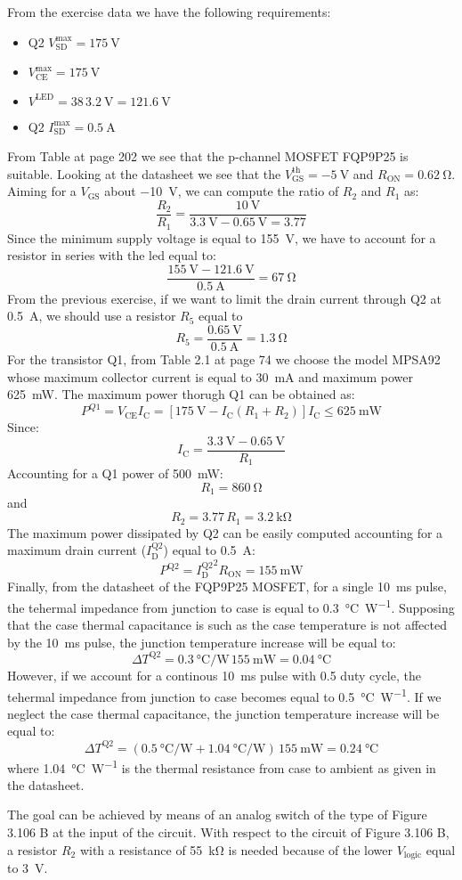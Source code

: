 From the exercise data we have the following requirements:
\begin{itemize}
    \item Q2 $V_\text{SD}^\text{max}=\SI{175}{\volt}$
    \item $V_\text{CE}^\text{max}=\SI{175}{\volt}$
    \item $V^\text{LED}=38\,\SI{3.2}{\volt}=\SI{121.6}{\volt}$
    \item Q2 $I_\text{SD}^\text{max}=\SI{0.5}{\ampere}$
\end{itemize}
From Table at page 202 we see that the p-channel MOSFET FQP9P25 is suitable. Looking at the datasheet we see that the $V_\text{GS}^\text{th}=-\SI{5}{\volt}$ and $R_\text{ON}=\SI{0.62}{\ohm}$. Aiming for a $V_\text{GS}$ about \SI{-10}{\volt}, we can compute the ratio of $R_2$ and $R_1$ as:
\[\frac{R_2}{R_1}=\frac{\SI{10}{\volt}}{\SI{3.3}{\volt}-\SI{0.65}{\volt}=3.77}\]
Since the minimum supply voltage is equal to \SI{155}{\volt}, we have to account for a resistor in series with the led equal to:
\[\frac{\SI{155}{\volt}-\SI{121.6}{\volt}}{\SI{0.5}{\ampere}}=\SI{67}{\ohm}\]
From the previous exercise, if we want to limit the drain current through Q2 at \SI{0.5}{\ampere}, we should use a resistor $R_5$ equal to
\[R_5=\frac{\SI{0.65}{\volt}}{\SI{0.5}{\ampere}}=\SI{1.3}{\ohm}\]
For the transistor Q1, from Table 2.1 at page 74 we choose the model MPSA92 whose maximum collector current is equal to \SI{30}{\milli\ampere} and maximum power \SI{625}{\milli\watt}. The maximum power thorugh Q1 can be obtained as:
\[P^{Q1}=V_\text{CE}I_\text{C}=[\SI{175}{\volt}-I_\text{C}(R_1+R_2)]I_\text{C}\leq\SI{625}{\milli\watt}\]
Since:
\[I_\text{C}=\frac{\SI{3.3}{\volt}-\SI{0.65}{\volt}}{R_1}\]
Accounting for a Q1 power of \SI{500}{\milli\watt}:
\[R_1=\SI{860}{\ohm}\]
and
\[R_2=3.77\,R_1=\SI{3.2}{\kilo\ohm}\]
The maximum power dissipated by Q2 can be easily computed accounting for a maximum drain current ($I_\text{D}^\text{Q2}$) equal to \SI{0.5}{\ampere}:
\[P^\text{Q2}={I_\text{D}^\text{Q2}}^2R_\text{ON}=\SI{155}{\milli\watt}\]
Finally, from the datasheet of the FQP9P25 MOSFET, for a single \SI{10}{\milli\second} pulse, the tehermal impedance from junction to case is equal to \SI{0.3}{\celsius\per\watt}. Supposing that the case thermal capacitance is such as the case temperature is not affected by the \SI{10}{\milli\second} pulse, the junction temperature increase will be equal to:
\[\Delta T^\text{Q2}= \SI{0.3}{\celsius\per\watt}\,\SI{155}{\milli\watt}=\SI{0.04}{\celsius}\]
However, if we account for a continous \SI{10}{\milli\second} pulse with \num{0.5} duty cycle, the tehermal impedance from junction to case becomes equal to \SI{0.5}{\celsius\per\watt}. If we neglect the case thermal capacitance, the  junction temperature increase will be equal to:
\[\Delta T^\text{Q2}= (\SI{0.5}{\celsius\per\watt}+\SI{1.04}{\celsius\per\watt})\,\SI{155}{\milli\watt}=\SI{0.24}{\celsius}\]
where \SI{1.04}{\celsius\per\watt} is the thermal resistance from case to ambient as given in the datasheet.

The goal can be achieved by means of an analog switch of the type of Figure 3.106 B at the input of the circuit. With respect to the circuit of Figure 3.106 B, a resistor $R_2$ with a resistance of \SI{55}{\kilo\ohm} is needed because of the lower $V_\text{logic}$ equal to \SI{3}{\volt}.